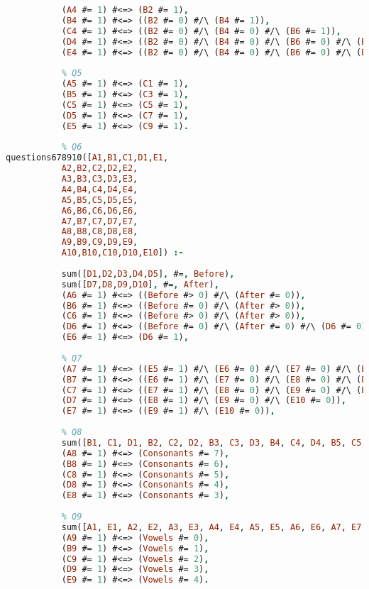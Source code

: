 \begin{lstlisting}[language=Prolog]
           % Q4
           (A4 #= 1) #<=> (B2 #= 1),
           (B4 #= 1) #<=> ((B2 #= 0) #/\ (B4 #= 1)),
           (C4 #= 1) #<=> ((B2 #= 0) #/\ (B4 #= 0) #/\ (B6 #= 1)),
           (D4 #= 1) #<=> ((B2 #= 0) #/\ (B4 #= 0) #/\ (B6 #= 0) #/\ (B8 #= 1)),
           (E4 #= 1) #<=> ((B2 #= 0) #/\ (B4 #= 0) #/\ (B6 #= 0) #/\ (B8 #= 0) #/\ (B10 #= 1)),
           
           % Q5
           (A5 #= 1) #<=> (C1 #= 1),
           (B5 #= 1) #<=> (C3 #= 1),
           (C5 #= 1) #<=> (C5 #= 1),
           (D5 #= 1) #<=> (C7 #= 1),
           (E5 #= 1) #<=> (C9 #= 1).
           
           % Q6
questions678910([A1,B1,C1,D1,E1,
           A2,B2,C2,D2,E2,
           A3,B3,C3,D3,E3,
           A4,B4,C4,D4,E4,
           A5,B5,C5,D5,E5,
           A6,B6,C6,D6,E6,
           A7,B7,C7,D7,E7,
           A8,B8,C8,D8,E8,
           A9,B9,C9,D9,E9,
           A10,B10,C10,D10,E10]) :-
           
           sum([D1,D2,D3,D4,D5], #=, Before),
           sum([D7,D8,D9,D10], #=, After),
           (A6 #= 1) #<=> ((Before #> 0) #/\ (After #= 0)),
           (B6 #= 1) #<=> ((Before #= 0) #/\ (After #> 0)),
           (C6 #= 1) #<=> ((Before #> 0) #/\ (After #> 0)),
           (D6 #= 1) #<=> ((Before #= 0) #/\ (After #= 0) #/\ (D6 #= 0)),
           (E6 #= 1) #<=> (D6 #= 1),
           
           % Q7
           (A7 #= 1) #<=> ((E5 #= 1) #/\ (E6 #= 0) #/\ (E7 #= 0) #/\ (E8 #= 0) #/\ (E9 #= 0) #/\ (E10 #= 0)),
           (B7 #= 1) #<=> ((E6 #= 1) #/\ (E7 #= 0) #/\ (E8 #= 0) #/\ (E9 #= 0) #/\ (E10 #= 0)),
           (C7 #= 1) #<=> ((E7 #= 1) #/\ (E8 #= 0) #/\ (E9 #= 0) #/\ (E10 #= 0)),
           (D7 #= 1) #<=> ((E8 #= 1) #/\ (E9 #= 0) #/\ (E10 #= 0)),
           (E7 #= 1) #<=> ((E9 #= 1) #/\ (E10 #= 0)),
           
           % Q8
           sum([B1, C1, D1, B2, C2, D2, B3, C3, D3, B4, C4, D4, B5, C5, D5, B6, C6, D6, B7, C7, D7, B8, C8, D8, B9, C9, D9, B10, C10, D10], #=, Consonants),
           (A8 #= 1) #<=> (Consonants #= 7),
           (B8 #= 1) #<=> (Consonants #= 6),
           (C8 #= 1) #<=> (Consonants #= 5),
           (D8 #= 1) #<=> (Consonants #= 4),
           (E8 #= 1) #<=> (Consonants #= 3),
           
           % Q9
           sum([A1, E1, A2, E2, A3, E3, A4, E4, A5, E5, A6, E6, A7, E7, A8, E8, A9, E9, A10, E10], #=, Vowels),
           (A9 #= 1) #<=> (Vowels #= 0),
           (B9 #= 1) #<=> (Vowels #= 1),
           (C9 #= 1) #<=> (Vowels #= 2),
           (D9 #= 1) #<=> (Vowels #= 3),
           (E9 #= 1) #<=> (Vowels #= 4).


\end{lstlisting}
